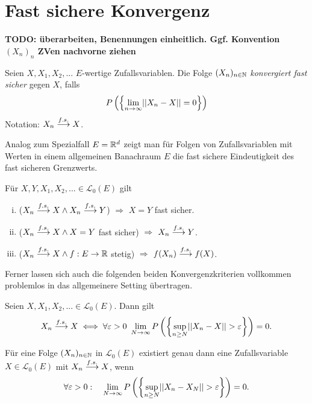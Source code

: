 \section{Fast sichere Konvergenz}
\textbf{TODO: überarbeiten, Benennungen einheitlich. Ggf. Konvention $(X_n)_n$  ZVen nachvorne ziehen}

\begin{mydef}
    Seien $X, X_1, X_2,...$ $E$-wertige Zufallsvariablen. Die Folge $(X_n)_{n \in \mathbb{N}}$ \textit{konvergiert fast sicher} gegen $X$, falls
    $$
        P\left(\left\{ \lim_{n \to \infty} \lvert\lvert X_n - X \rvert\rvert = 0 \right\}\right)
    $$
Notation: $X_n \overset{f.s.}{\longrightarrow} X$. 
\end{mydef}

Analog zum Spezialfall $E = \mathbb{R}^d$ zeigt man für Folgen von Zufallsvariablen mit Werten in einem allgemeinen Banachraum $E$ die fast sichere Eindeutigkeit des fast sicheren Grenzwerts. 
\begin{proposition}
    Für $X,Y,X_1,X_2,... \in \mathcal{L}_0(E)$ gilt 
    \begin{enumerate}[(i)]
        \item ($X_n \overset{f.s.}{\longrightarrow} X \land X_n \overset{f.s.}{\longrightarrow} Y$) $\Rightarrow$ $ X = Y$ fast sicher. 
        \item ($X_n \overset{f.s.}{\longrightarrow} X \land X = Y$ fast sicher) $\Rightarrow$ $X_n \overset{f.s.}{\longrightarrow} Y$. 
        \item ($X_n \overset{f.s.}{\longrightarrow} X \land f:E \to \mathbb{R}$ stetig) $\Rightarrow$ $f(X_n) \overset{f.s.}{\longrightarrow} f(X)$. 
    \end{enumerate}
\end{proposition}

Ferner lassen sich auch die folgenden beiden Konvergenzkriterien vollkommen problemlos in das allgemeinere Setting übertragen. 

\begin{theorem}
    Seien $X, X_1,X_2,... \in \mathcal{L}_0(E)$. Dann gilt
    \begin{align*}
        X_n \overset{f.s.}{\longrightarrow} X \iff \forall \varepsilon > 0 \ \lim_{N \to \infty}P\left(\left\{ \sup_{n \geq N}\lvert\lvert X_n - X \rvert\rvert > \varepsilon \right\}\right) = 0.
    \end{align*}
\end{theorem}

\begin{theorem}
    Für eine Folge $(X_n)_{n \in \mathbb{N}}$ in $\mathcal{L}_0(E)$ existiert genau dann eine Zufallsvariable $X \in \mathcal{L}_0(E)$ mit $X_n \overset{f.s.}{\longrightarrow} X$, wenn
    $$
        \forall \varepsilon > 0 : \quad \lim_{N \to \infty}P\left(\left\{ \sup_{n\geq N}\lvert\lvert X_n - X_N \rvert\rvert > \varepsilon \right\}\right) = 0. 
    $$
\end{theorem}

